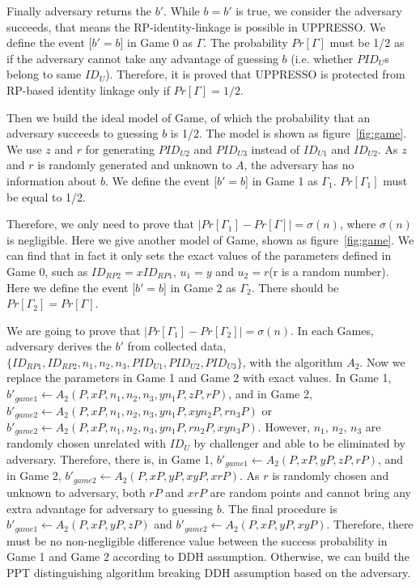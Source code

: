 {Finally adversary returns the $b'$. While $b=b'$ is true, we consider the adversary succeeds, that means the RP-identity-linkage is possible in UPPRESSO.
We define the event [$b'=b$] in Game 0 as $\Gamma$. The probability $Pr[\Gamma]$ must be 1/2 as if the adversary cannot take any advantage of guessing $b$ (i.e.  whether $PID_U$s belong to same $ID_U$). Therefore, it is proved that UPPRESSO is protected from RP-based identity linkage only if $Pr[\Gamma]=1/2$.

Then we build the ideal model of Game, of which the probability  that an adversary succeeds to guessing $b$ is 1/2. The model is shown as figure~\ref{fig:game}. We use $z$ and $r$ for generating $PID_{U2}$ and $PID_{U3}$ instead of $ID_{U1}$ and $ID_{U2}$. As $z$ and $r$ is randomly generated and unknown to $A$, the adversary has no information about $b$. We  define the event [$b'=b$] in Game 1 as $\Gamma_1$. $Pr[\Gamma_1]$ must be equal to 1/2. 

Therefore, we only need to prove that $|Pr[\Gamma_1]-Pr[\Gamma]|=\sigma(n)$, where $\sigma(n)$ is negligible. Here we give another model of Game, shown as figure~\ref{fig:game}. We can find that in fact it only sets the exact values of the parameters defined in Game 0, such as $ID_{RP2}=xID_{RP1}$, $u_1=y$ and $u_2=r$(r is a random number).  Here we define the event [$b'=b$] in Game 2 as $\Gamma_2$. There should be $Pr[\Gamma_2]=Pr[\Gamma]$.

We are going to prove that $|Pr[\Gamma_1]-Pr[\Gamma_2]|=\sigma(n)$. In each Games, adversary derives the $b'$ from collected data, $\{ID_{RP1},ID_{RP2},n_1,n_2,n_3,PID_{U1},PID_{U2},PID_{U3}\}$, with the algorithm $A_2$. Now we replace the parameters in Game 1 and Game 2 with exact values. In Game 1, $b'_{game1}\gets A_2(P,xP,n_1,n_2,n_3,yn_1P,zP,rP)$, and in Game 2, $b'_{game2}\gets A_2(P,xP,n_1,n_2,n_3,yn_1P,xyn_2P,rn_3P)$ or $b'_{game2}\gets A_2(P,xP,n_1,n_2,n_3,yn_1P,rn_2P,xyn_3P)$. 
However, $n_1$, $n_2$, $n_3$ are randomly chosen unrelated with $ID_U$ by challenger and able to be eliminated by adversary. Therefore, there is, in Game 1, $b'_{game1}\gets A_2(P,xP,yP,zP,rP)$, and in Game 2, $b'_{game2}\gets A_2(P,xP,yP,xyP,xrP)$. As $r$ is randomly chosen and unknown to adversary, both $rP$ and $xrP$ are random points and cannot bring any extra advantage for adversary to guessing $b$.  The final procedure is $b'_{game1}\gets A_2(P,xP,yP,zP)$ and $b'_{game2}\gets A_2(P,xP,yP,xyP)$. Therefore, there must be no non-negligible difference value between the success probability in Game 1 and Game 2 according to DDH assumption. Otherwise, we can build the PPT distinguishing algorithm breaking DDH assumption based on the adversary. 

}
